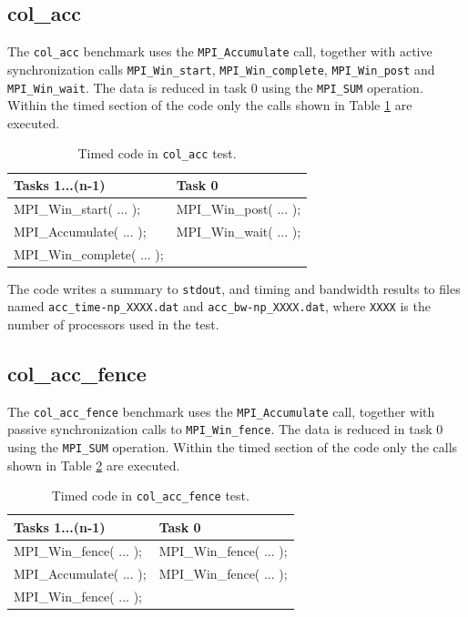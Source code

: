 \documentclass[10pt,a4paper]{report}
\begin{document}
\subsection{col\_acc}
The \verb+col_acc+ benchmark uses the \verb+MPI_Accumulate+ call, together with active synchronization calls \verb+MPI_Win_start+, \verb+MPI_Win_complete+, \verb+MPI_Win_post+ and \verb+MPI_Win_wait+. The data is reduced in task 0 using the \verb+MPI_SUM+ operation. Within the timed section of the code only the calls shown in Table \ref{tab:acc} are executed.

\begin{table}[ht]
\centering
\caption{Timed code in \texttt{col\_acc} test.}
\label{tab:acc}
\begin{tabular}{|l|l|}
\hline
\bf{Tasks 1...(n-1)}	   & \bf{Task 0}\\\hline
MPI\_Win\_start( ... );    & MPI\_Win\_post( ... );\\
MPI\_Accumulate( ... );    & MPI\_Win\_wait( ... );\\
MPI\_Win\_complete( ... ); & \\\hline
\end{tabular}
\end{table}

The code writes a summary to \verb+stdout+, and timing and bandwidth results to files named \verb+acc_time-np_XXXX.dat+ and \verb+acc_bw-np_XXXX.dat+, where \verb+XXXX+ is the number of processors used in the test.

\FloatBarrier
\subsection{col\_acc\_fence}
The \verb+col_acc_fence+ benchmark uses the \verb+MPI_Accumulate+ call, together with passive synchronization calls to \verb+MPI_Win_fence+. The data is reduced in task 0 using the \verb+MPI_SUM+ operation. Within the timed section of the code only the calls shown in Table \ref{tab:acc_fence} are executed.

\begin{table}[ht]
\centering
\caption{Timed code in \texttt{col\_acc\_fence} test.}
\label{tab:acc_fence}
\begin{tabular}{|l|l|}
\hline
\bf{Tasks 1...(n-1)}	    & \bf{Task 0}\\\hline
MPI\_Win\_fence( ... ); & MPI\_Win\_fence( ... );\\
MPI\_Accumulate( ... ); & MPI\_Win\_fence( ... );\\
MPI\_Win\_fence( ... ); & \\\hline
\end{tabular}
\end{table}
\end{document}
